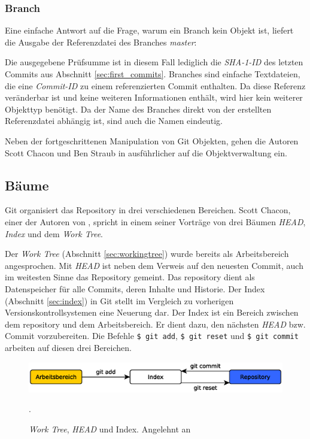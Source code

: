 \subsubsection{Branch}\label{sec:branchobject}
Eine einfache Antwort auf die Frage, warum ein Branch kein Objekt ist, liefert
die Ausgabe der Referenzdatei des Branches \textit{master}:


Die ausgegebene Prüfsumme ist in diesem Fall lediglich die \textit{SHA-1-ID}
des letzten Commits aus Abschnitt \ref{sec:first_commits}. Branches sind
einfache Textdateien, die eine \textit{Commit-ID} zu einem referenzierten
Commit enthalten. Da diese Referenz veränderbar ist und keine weiteren
Informationen enthält, wird hier kein weiterer Objekttyp benötigt. Da der Name
des Branches direkt von der erstellten Referenzdatei abhängig ist, sind auch
die Namen eindeutig.

Neben der fortgeschrittenen Manipulation von Git Objekten, gehen die Autoren
Scott Chacon und Ben Straub in \cite[S.~408-418]{progit} ausführlicher
auf die Objektverwaltung ein.

\subsection{Bäume}\label{sec:trees}
Git organisiert das Repository in drei verschiedenen Bereichen. Scott Chacon,
einer der Autoren von \cite{progit}, spricht in einem seiner
Vorträge \cite{link:talesoftrees} von drei Bäumen \textit{HEAD}, \textit{Index}
und dem \textit{Work Tree}.

Der \textit{Work Tree} (Abschnitt \ref{sec:workingtree}) wurde bereits als
Arbeitsbereich angesprochen. Mit \textit{\gls{HEAD}} ist neben dem Verweis auf
den neuesten Commit, auch im weitesten Sinne das Repository gemeint. Das
\gls{repository} dient als Datenspeicher für alle Commits, deren Inhalte und
Historie. Der Index (Abschnitt \ref{sec:index}) in Git stellt im Vergleich zu
vorherigen Versionskontrollsystemen eine Neuerung dar. Der Index ist ein
Bereich zwischen dem \gls{repository} und dem Arbeitsbereich. Er dient dazu,
den nächsten \textit{\gls{HEAD}} bzw. Commit vorzubereiten. Die Befehle
\texttt{\$ git add}, \texttt{\$ git reset} und \texttt{\$ git commit} arbeiten
auf diesen drei Bereichen. \cite[34-35]{gitosp}

\begin{figure}[h]
    \centering
    \includegraphics[scale=0.60]{images/trees.eps}
    \caption{\textit{Work Tree}, \textit{HEAD} und Index. Angelehnt an
    \cite[34]{gitosp}}.
    \label{fig:trees}
\end{figure}

